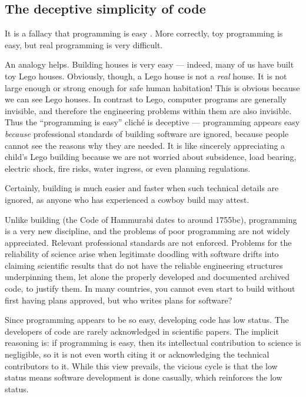 \begin{change}
\subsection{The deceptive simplicity of code}\label{deceptive-simplicity-of-code}
It is a fallacy that programming is easy \cite{fixit}. More correctly, toy programming is easy, but real programming is very difficult.

An analogy helps. Building houses is very easy --- indeed, many of us have built toy Lego houses. Obviously, though, a Lego house is not a \emph{real\/} house. It is not large enough or strong enough for safe human habitation! This is obvious because we can see Lego houses. In contrast to Lego, computer programs are generally invisible, and therefore the engineering problems within them are also invisible. Thus the ``programming is easy'' clich\' e is deceptive --- programming appears easy \emph{because\/} professional standards of building software are ignored, because people cannot see the reasons why they are needed. It is like sincerely appreciating a child's Lego building because we are not worried about subsidence, load bearing, electric shock, fire risks, water ingress, or even planning regulations. 

Certainly, building is much easier and faster when such technical details are ignored, as anyone who has experienced a cowboy build may attest.

Unlike building (the Code of Hammurabi dates to around 1755{\sc bc}), programming is a very new discipline, and the problems of poor programming are not widely appreciated. Relevant professional standards are not enforced. Problems for the reliability of science arise when legitimate doodling with software drifts into claiming scientific results that do not have the reliable engineering structures underpinning them, let alone the properly developed and documented archived code, to justify them. In many countries, you cannot even start to build without first having plans approved, but who writes plans for software?

Since programming appears to be so easy, developing code has low status. The developers of code are rarely acknowledged in scientific papers. The implicit reasoning is: if programming is easy, then its intellectual contribution to science is negligible, so it is not even worth citing it or acknowledging the technical contributors to it. While this view prevails, the vicious cycle is that the low status means software development is done casually, which reinforces the low status.


\end{change}
